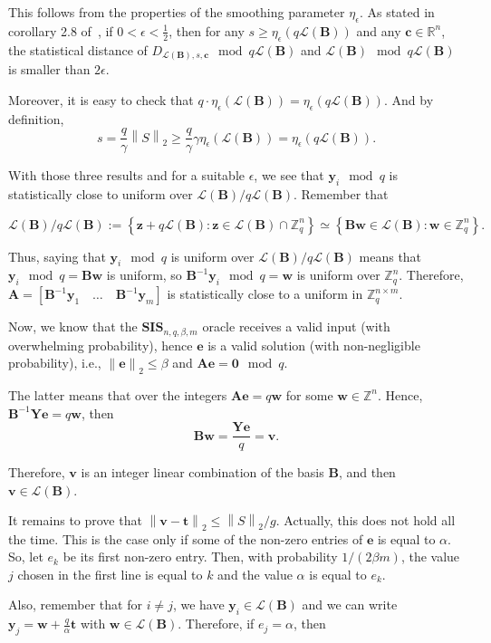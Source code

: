 \documentclass[a4paper,11pt]{article}
\let\vec\mathbf %
\newcommand\R{{\mathbb R}}
\newcommand\Zqn{{\mathbb Z}_q^n}
\newcommand\Zn{{\mathbb Z}^n}
\newcommand\Zqnm{{\mathbb Z}_q^{n\times m}}
\newcommand\A{{\mathbf A}}
\newcommand\LB{\mathcal{L}\left(\vec B\right)}
\newcommand\DLs[1]{D_{\LB, s, #1}}
\newcommand\smooth{\eta_\epsilon}
\newcommand\SIS{\textbf{SIS}_{n, q, \beta, m}}
\newcommand{\norm}[1]{\left\lVert #1 \right\rVert_2}
\theoremstyle{definition}
\theoremstyle{remark}
\begin{document}
This follows from the properties of the smoothing parameter $\smooth$. As 
stated in corollary 2.8 of~\cite{gpv07}, if $0 < \epsilon < \frac 1 2$, then 
for any $s \ge \smooth(q\LB)$ and any $\vec c \in \R^n$, the statistical 
distance of $\DLs{\vec c} \mod q\LB$ and $\LB \mod q\LB$ is smaller than 
$2\epsilon$.

Moreover, it is easy to check that $q \cdot \smooth(\LB) = \smooth(q\LB)$. And 
by definition, 
$$s =\frac{q}{\gamma}\norm{S} \ge \frac{q}{\gamma}\gamma\smooth(\LB) = 
\smooth(q\LB).$$

With those three results and for a suitable $\epsilon$, we see that $\vec y_i 
\mod q$ is statistically close to uniform over $\LB/q\LB$. Remember that 

$$\LB/q\LB := \left\{ \vec z + q\LB : \vec z \in \LB\cap\Zqn \right\} \simeq 
\left\{ \vec B \vec w \in \LB : \vec w \in \Zqn \right\}.$$

Thus, saying that $\vec y_i \mod q$ is uniform over $\LB/q\LB$ means that 
$\vec y_i \mod q = \vec B \vec w$ is uniform, so $\vec{B}^{-1}\vec y_i \mod q = 
\vec w$ is uniform over $\Zqn$. Therefore, $\A = [\vec{B}^{-1}\vec y_1 \quad 
\dots \quad \vec{B}^{-1}\vec y_m]$ is statistically close to a uniform in 
$\Zqnm$.

Now, we know that the $\SIS$ oracle receives a valid input (with 
overwhelming probability), hence $\vec e$ is a valid solution (with 
non-negligible probability), i.e., $\norm{\vec e} \le \beta$ and $\A \vec e = 
\vec 0 \mod q$. 

The latter means that over the integers $\A \vec e = q\vec w$ for some $\vec w 
\in \Zn$. Hence, $\vec{B}^{-1}\vec Y\vec e = q\vec w$, then $$\vec{B}\vec w 
=\frac{\vec Y\vec e }{q} = \vec v.$$

Therefore, $\vec v$ is an integer linear combination of the basis $\vec B$, and 
then $\vec v \in \LB$.

It remains to prove that $\norm{\vec v - \vec t} \le \norm{S} / g$. Actually, 
this does not hold all the time. This is the case only if some of the non-zero 
entries of $\vec e$ is equal to $\alpha$. So, let $e_k$ be its first 
non-zero entry. Then, with probability $1/(2\beta m)$, the value $j$ chosen in 
the first line is equal to $k$ and the value $\alpha$ is equal to $e_k$.

Also, remember that for $i \not=j$, we have $\vec y_i \in \LB$ and we can 
write $\vec y_j =  \vec{w} + \frac{q}{\alpha} \vec t$ with $\vec w \in \LB$. 
Therefore, if $e_j = \alpha$, then
\end{document}
